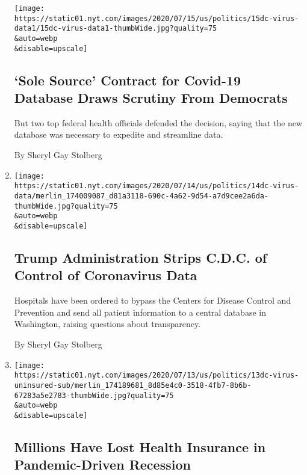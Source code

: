 \begin{enumerate}
  \texttt{[image: https://static01.nyt.com/images/2020/07/15/us/politics/15dc-virus-data1/15dc-virus-data1-thumbWide.jpg?quality=75\\\&auto=webp\\\&disable=upscale]}

  \hypertarget{sole-source-contract-for-covid-19-database-draws-scrutiny-from-democrats}{%
  \subsection{`Sole Source' Contract for Covid-19 Database Draws
  Scrutiny From
  Democrats}\label{sole-source-contract-for-covid-19-database-draws-scrutiny-from-democrats}}

  But two top federal health officials defended the decision, saying
  that the new database was necessary to expedite and streamline data.

  By Sheryl Gay Stolberg
\item
  \href{/2020/07/14/us/politics/trump-cdc-coronavirus.html}{}

  \texttt{[image: https://static01.nyt.com/images/2020/07/14/us/politics/14dc-virus-data/merlin\_174009087\_d81a3118-690c-4a62-9d54-a7d9cee2a6da-thumbWide.jpg?quality=75\\\&auto=webp\\\&disable=upscale]}

  \hypertarget{trump-administration-strips-cdc-of-control-of-coronavirus-data}{%
  \subsection{Trump Administration Strips C.D.C. of Control of
  Coronavirus
  Data}\label{trump-administration-strips-cdc-of-control-of-coronavirus-data}}

  Hospitals have been ordered to bypass the Centers for Disease Control
  and Prevention and send all patient information to a central database
  in Washington, raising questions about transparency.

  By Sheryl Gay Stolberg
\item
  \href{/2020/07/13/us/politics/coronavirus-health-insurance-trump.html}{}

  \texttt{[image: https://static01.nyt.com/images/2020/07/13/us/politics/13dc-virus-uninsured-sub/merlin\_174189681\_8d85e4c0-3518-4fb7-8b6b-67283a5e2783-thumbWide.jpg?quality=75\\\&auto=webp\\\&disable=upscale]}

  \hypertarget{millions-have-lost-health-insurance-in-pandemic-driven-recession}{%
  \subsection{Millions Have Lost Health Insurance in Pandemic-Driven
  Recession}\label{millions-have-lost-health-insurance-in-pandemic-driven-recession}}


\end{enumerate}
